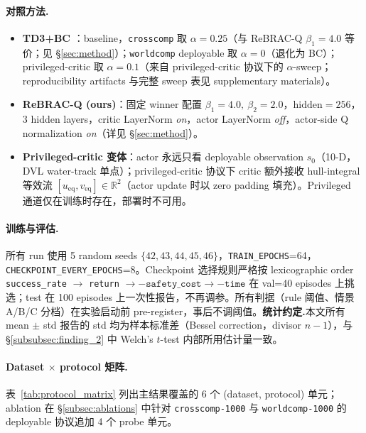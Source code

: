 \paragraph{对照方法.}
\begin{itemize}
    \item \textbf{TD3+BC} \citep{fujimoto2021td3bc}：baseline，\texttt{crosscomp} 取 $\alpha=0.25$（与 ReBRAC-Q $\beta_1=4.0$ 等价；见 \S\ref{sec:method}）；\texttt{worldcomp} deployable 取 $\alpha=0$（退化为 BC）；privileged-critic 取 $\alpha=0.1$（来自 privileged-critic 协议下的 $\alpha$-sweep；reproducibility artifacts 与完整 sweep 表见 supplementary materials）。
    \item \textbf{ReBRAC-Q (ours)}：固定 winner 配置 $\beta_1=4.0,\ \beta_2=2.0$，$\mathrm{hidden}=256$，3 hidden layers，critic LayerNorm \emph{on}，actor LayerNorm \emph{off}，actor-side Q normalization \emph{on}（详见 \S\ref{sec:method}）。
    \item \textbf{Privileged-critic 变体}：actor 永远只看 deployable observation $s_0$（10-D，DVL water-track 单点）；privileged-critic 协议下 critic 额外接收 hull-integral 等效流 $[u_{\mathrm{eq}}, v_{\mathrm{eq}}] \in \mathbb{R}^2$（actor update 时以 zero padding 填充）。Privileged 通道仅在训练时存在，部署时不可用。
\end{itemize}

\paragraph{训练与评估.}
所有 run 使用 5 random seeds $\{42, 43, 44, 45, 46\}$，\texttt{TRAIN\_EPOCHS}=64，\texttt{CHECKPOINT\_EVERY\_EPOCHS}=8。Checkpoint 选择规则严格按 lexicographic order \texttt{success\_rate} $\to$ \texttt{return} $\to -\texttt{safety\_cost} \to -\texttt{time}$ 在 val=40 episodes 上挑选；test 在 100 episodes 上一次性报告，不再调参。所有判据（rule 阈值、情景 A/B/C 分档）在实验启动前 pre-register，事后不调阈值。\textbf{统计约定.}\quad 本文所有 mean $\pm$ std 报告的 std 均为样本标准差（Bessel correction，divisor $n-1$），与 \S\ref{subsubsec:finding_2} 中 Welch's $t$-test 内部所用估计量一致。

\paragraph{Dataset $\times$ protocol 矩阵.}
表~\ref{tab:protocol_matrix} 列出主结果覆盖的 6 个 (dataset, protocol) 单元；ablation 在 \S\ref{subsec:ablations} 中针对 \texttt{crosscomp-1000} 与 \texttt{worldcomp-1000} 的 deployable 协议追加 4 个 probe 单元。

